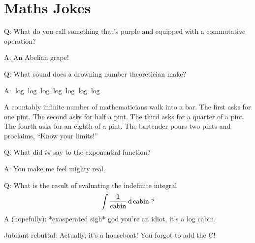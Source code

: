 \section{Maths Jokes}

Q: What do you call something that's purple and equipped with a commutative
operation?

A: An Abelian grape!

Q: What sound does a drowning number theoretician make?

A: \(\log \log \log \log \log \log \log\)

A countably infinite number of mathematicians walk into a bar.
{The first asks for one pint.
\footnotesize The second asks for half a pint.
\scriptsize The third asks for a quarter of a pint.
\tiny The fourth asks for an eighth of a pint.}
The bartender pours two pints and proclaims, ``Know your limits!''

Q: What did \(i \pi\) say to the exponential function?

A: You make me feel mighty real.

Q: What is the result of evaluating the indefinite integral
\begin{equation*}
 \integ{\frac 1{\mathrm{cabin}}}{\,\mathrm{cabin}} \ \text?
\end{equation*}
A (hopefully): *exasperated sigh* god you're an idiot, it's a log cabin.

Jubilant rebuttal: Actually, it's a houseboat! You forgot to add the C!
